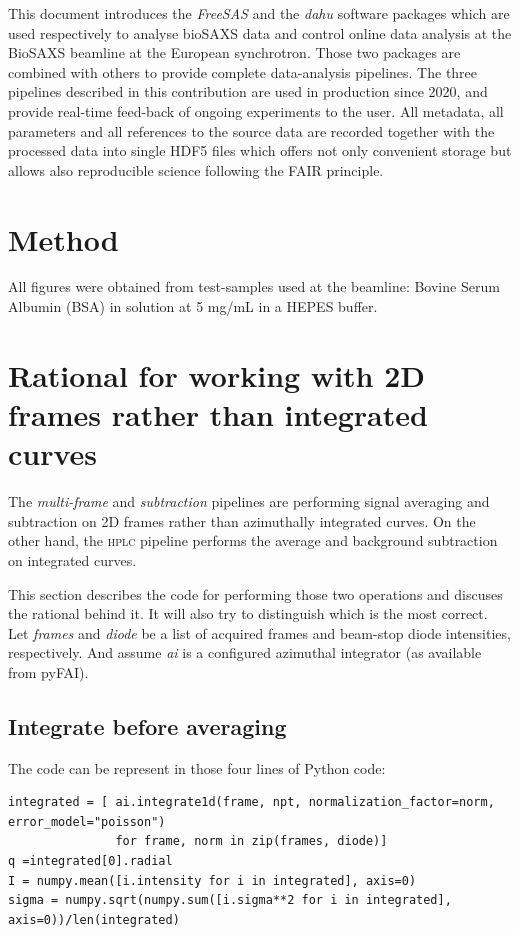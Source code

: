 \documentclass[preprint]{iucr}              %
\begin{document}
This document introduces the \textit{FreeSAS} and the \textit{dahu} software packages which are used respectively to analyse bioSAXS data 
and control online data analysis at the BioSAXS beamline at the European synchrotron. 
Those two packages are combined with others to provide complete data-analysis pipelines.
The three pipelines described in this contribution are used in production since 2020, and provide real-time feed-back of ongoing experiments to the user.
All metadata, all parameters and all references to the source data are recorded together with the processed data into single HDF5 files which offers 
not only convenient storage but allows also reproducible science following the FAIR principle. 

\appendix
\section{Method}

All figures were obtained from test-samples used at the beamline: Bovine Serum Albumin (BSA) in solution at 5 mg/mL in a HEPES buffer.

\section{Rational for working with 2D frames rather than integrated curves}
\label{rational}
The \textit{multi-frame} and \textit{subtraction} pipelines are performing signal averaging and subtraction on 2D frames rather than azimuthally integrated curves.
On the other hand, the \textsc{hplc} pipeline performs the average and background subtraction on integrated curves.

This section describes the code for performing those two operations and discuses the rational behind it.
It will also try to distinguish which is the most correct. 
Let \textit{frames} and \textit{diode} be a list of acquired frames and beam-stop diode intensities, respectively.
And assume \textit{ai} is a configured azimuthal integrator (as available from pyFAI).

\subsection{Integrate before averaging}
The code can be represent in those four lines of Python code:
\begin{verbatim} 
integrated = [ ai.integrate1d(frame, npt, normalization_factor=norm, error_model="poisson") 
               for frame, norm in zip(frames, diode)]
q =integrated[0].radial
I = numpy.mean([i.intensity for i in integrated], axis=0)
sigma = numpy.sqrt(numpy.sum([i.sigma**2 for i in integrated], axis=0))/len(integrated)
\end{verbatim}
\end{document}
